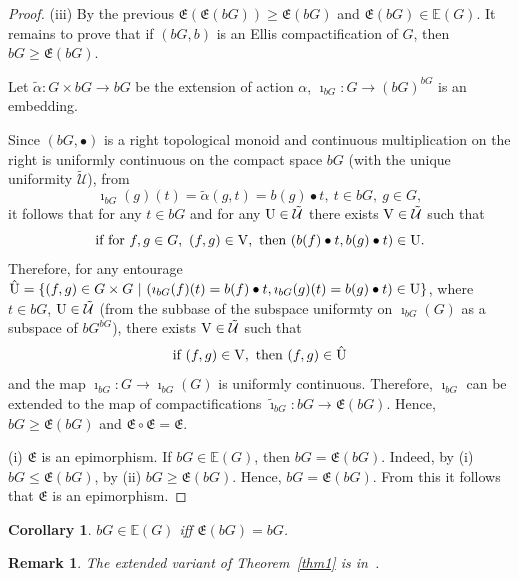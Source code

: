 \documentclass{amsart}
\newtheorem{cor}[thm]{Corollary}
\newtheorem{rem}[thm]{Remark}
\begin{document}
\begin{proof}
(iii) By the previous $\mathfrak{E}(\mathfrak{E}(b G))\geq\mathfrak{E} (b G)$ and   $\mathfrak{E}(b G)\in\mathbb{E} (G)$. It remains to prove that if $(b G, b)$ is an Ellis compactification of $G$, then $b G\geq\mathfrak{E}(b G)$. 

Let $\tilde\alpha: G\times bG\to bG$ be the extension of action $\alpha$, $\imath_{b G}: G\to (bG)^{bG}$ is an embedding. 

Since $(bG, \bullet)$ is a right topological monoid and continuous multiplication on the right is uniformly continuous on the compact space $b G$ (with the unique uniformity $\tilde{\mathcal U}$), from 
$$\imath_{b G} (g)(t)=\tilde\alpha (g, t)=b (g)\bullet t,\ t\in bG,\ g\in G,$$
it follows that for any $t\in bG$ and   for any ${\rm U}\in \tilde{\mathcal U}$ there exists ${\rm V}\in \tilde{\mathcal U}$ such that 
$$\mbox{if for}\ f, g\in G,\ (f, g)\in {\rm V},\ \mbox{then}\ (b (f)\bullet t, b (g)\bullet t)\in {\rm U}.$$
Therefore, for any entourage $\hat {\rm U}=\{ (f, g)\in G\times G\ |\ (\imath_{b G} (f)(t)=b (f)\bullet t, \imath_{b G} (g)(t)=b (g)\bullet t)\in {\rm U}\}$, where $t\in bG$, ${\rm U}\in\tilde{\mathcal U}$ (from the subbase of the subspace uniformty on $\imath_{b G}(G)$ as a subspace of $b G^{b G}$), there exists  ${\rm V}\in\tilde{\mathcal U}$ such that 
$$\mbox{if}\ (f, g)\in {\rm V},\ \mbox{then}\  (f, g)\in \hat {\rm U}$$
and the map $\imath_{b G}: G\to\imath_{b G} (G)$ is uniformly continuous. Therefore,  $\imath_{b G}$ can be extended to the map of compactifications $\tilde\imath_{b G}: b G\to\mathfrak{E}(b G)$. Hence, $b G\geq\mathfrak{E}(b G)$ and $\mathfrak{E}\circ\mathfrak{E}=\mathfrak{E}$.

\medskip

(i) $\mathfrak{E}$ is an epimorphism. If $b G\in\mathbb{E}(G)$, then $b G=\mathfrak{E}(b G)$. Indeed, by (i) $b G\leq\mathfrak{E}(b G)$, by (ii) $b G\geq\mathfrak{E}(b G)$. Hence, $b G=\mathfrak{E}(b G)$. From this it follows that $\mathfrak{E}$ is an epimorphism. 
\end{proof}

\begin{cor}\label{idemcoin}
$b G\in\mathbb E (G)$ iff $\mathfrak{E}(b G)=b G$.
\end{cor}

\begin{rem}
{\rm The extended variant of Theorem~\ref{thm1} is in~\cite[Theorem 2.22]{KozlovSorin}.}
\end{rem}

\end{document}
